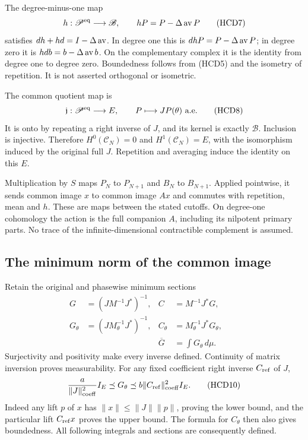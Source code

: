 \documentclass[11pt,a4paper]{article}
\theoremstyle{definition}
\begin{document}
The degree-minus-one map
\[
 h:\mathscr P^{\rm eq}\longrightarrow\mathscr B,\qquad
 hP=P-\Delta\operatorname{av} P
 \tag{HCD7}
\]
satisfies $dh+hd=I-\Delta\operatorname{av}$. In degree one this is
$dhP=P-\Delta\operatorname{av} P$; in degree zero it is
$hd b=b-\Delta\operatorname{av} b$. On the complementary complex it
is the identity from degree one to degree zero. Boundedness
follows from (HCD5) and the isometry of repetition.
It is not asserted orthogonal or isometric.

The common quotient map is
\[
 \mathfrak j:\mathscr P^{\rm eq}\longrightarrow E,\qquad
 P\longmapsto JP(\theta)\text{ a.e.}
 \tag{HCD8}
\]
It is onto by repeating a right inverse of $J$, and its
kernel is exactly $\mathscr B$. Inclusion is injective.
Therefore $H^0(\mathscr C_N)=0$ and $H^1(\mathscr C_N)=E$,
with the isomorphism induced by the original full $J$.
Repetition and averaging induce the identity on this $E$.

Multiplication by $S$ maps $P_N$ to $P_{N+1}$ and $B_N$
to $B_{N+1}$. Applied pointwise, it sends common image $x$
to common image $Ax$ and commutes with repetition, mean
and $h$. These are maps between the stated cutoffs.
On degree-one cohomology the action is the full companion
$A$, including its nilpotent primary parts. No trace of
the infinite-dimensional contractible complement is assumed.

\subsection{The minimum norm of the common image}

Retain the original and phasewise minimum sections
\[
 \begin{aligned}
 G&=(JM^{-1}J^*)^{-1},& C&=M^{-1}J^*G,\\
 G_\theta&=(JM_\theta^{-1}J^*)^{-1},&
 C_\theta&=M_\theta^{-1}J^*G_\theta,\qquad\\
 &&\overline G&=\int G_\theta\,d\mu.
 \end{aligned}
 \tag{HCD9}
\]
Surjectivity and positivity make every inverse defined.
Continuity of matrix inversion proves measurability.
For any fixed coefficient right inverse $C_{\rm ref}$ of $J$,
\[
 \frac{a}{\|J\|_{\rm coeff}^2}I_E
 \preceq G_\theta
 \preceq b\|C_{\rm ref}\|_{\rm coeff}^2I_E.
 \tag{HCD10}
\]
Indeed any lift $p$ of $x$ has
$\|x\|\le\|J\|\|p\|$, proving the lower bound, and the
particular lift $C_{\rm ref}x$ proves the upper bound.
The formula for $C_\theta$ then also gives boundedness.
All following integrals and sections are consequently defined.
\end{document}
